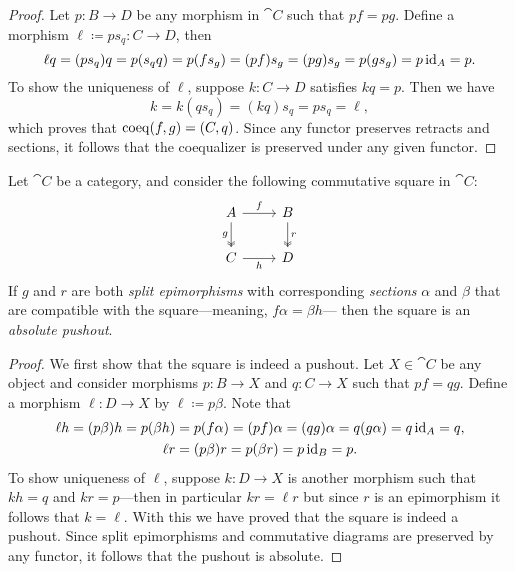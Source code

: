 \begin{proof}
Let \(p: B \to D\) be any morphism in \(\cat C\) such that \(p f = p g\). Define
a morphism \(\ell \coloneq p s_q: C \to D\), then
\[
\ell q = (p s_q) q
= p (s_q q)
= p (f s_g)
= (p f) s_g
= (p g) s_g
= p (g s_g)
= p \operatorname{id}_A
= p.
\]
To show the uniqueness of \(\ell\), suppose \(k: C \to D\) satisfies \(k q =
p\). Then we have
\[
k = k (q s_q)
= (k q) s_q
= p s_q
= \ell,
\]
which proves that \(\operatorname{coeq}(f, g) = (C, q)\). Since any functor preserves retracts
and sections, it follows that the coequalizer is preserved under any given
functor.
\end{proof}

\begin{proposition}
\label{prop:absolute-pushout}
Let \(\cat C\) be a category, and consider the following commutative square in
\(\cat C\):
\[
\begin{tikzcd}
A \ar[r, "f"] \ar[d, two heads, "g"']
&B \ar[d, two heads,"r"] \\
C \ar[r, "h"'] &D
\end{tikzcd}
\]
If \(g\) and \(r\) are both \emph{split epimorphisms} with corresponding
\emph{sections} \(\alpha\) and \(\beta\) that are compatible with the
square---meaning, \(f \alpha = \beta h\)--- then the square is an \emph{absolute
  pushout}.
\end{proposition}

\begin{proof}
We first show that the square is indeed a pushout. Let \(X \in \cat C\) be any
object and consider morphisms \(p: B \to X\) and \(q: C \to X\) such that
\(p f = q g\). Define a morphism \(\ell: D \to X\) by \(\ell \coloneq p
\beta\). Note that
\begin{gather*}
\ell h = (p \beta) h = p (\beta h) = p (f \alpha) = (p f) \alpha
= (q g) \alpha = q (g \alpha) = q \operatorname{id}_A = q, \\
\ell r = (p \beta) r = p (\beta r) = p \operatorname{id}_B = p.
\end{gather*}
To show uniqueness of \(\ell\), suppose \(k: D \to X\) is another morphism such
that \(k h = q\) and \(k r = p\)---then in particular \(k r = \ell r\) but since
\(r\) is an epimorphism it follows that \(k = \ell\). With this we have proved
that the square is indeed a pushout. Since split epimorphisms and commutative
diagrams are preserved by any functor, it follows that the pushout is absolute.
\end{proof}
